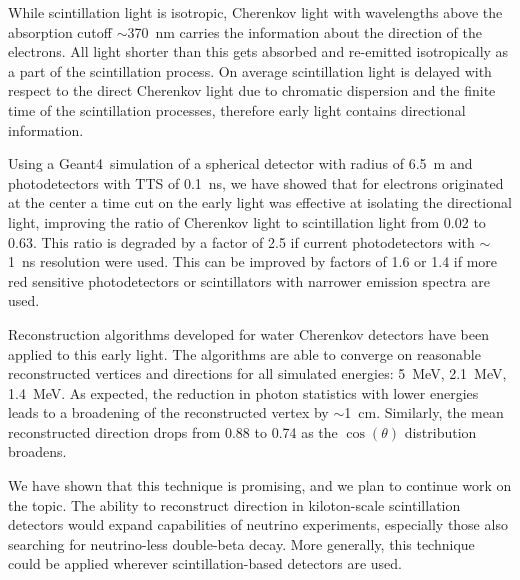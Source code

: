 \documentclass[cits]{JINST}
\begin{document}
While scintillation light is isotropic, Cherenkov light with wavelengths above the absorption cutoff $\sim$370~nm carries the information about the direction of the electrons. All light shorter than this gets absorbed and re-emitted isotropically as a part of the scintillation process. On average scintillation light is delayed with respect to the direct Cherenkov light due to chromatic dispersion and the finite time of the scintillation processes, therefore early light contains directional information.

Using a Geant4~simulation of a spherical detector with radius of 6.5~m and photodetectors with TTS of 0.1~ns, we have showed that for electrons originated at the center a time cut on the early light was effective at isolating the directional light, improving the ratio of Cherenkov light to scintillation light from 0.02 to 0.63. This ratio is degraded by a factor of 2.5 if current photodetectors with $\sim$1~ns resolution were used. This can be improved by factors of 1.6 or 1.4 if more red sensitive photodetectors or scintillators with narrower emission spectra are used.

Reconstruction algorithms developed for water Cherenkov detectors have been applied to this early light. The algorithms are able to converge on reasonable reconstructed vertices and directions for all simulated energies: 5~MeV, 2.1~MeV, 1.4~MeV. As expected, the reduction in photon statistics with lower energies leads to a broadening of the reconstructed vertex by $\sim$1~cm. Similarly, the mean reconstructed direction drops from 0.88 to 0.74 as the $\cos(\theta)$ distribution broadens.

We have shown that this technique is promising, and we plan to continue work on the topic. The ability to reconstruct direction in kiloton-scale scintillation detectors would expand capabilities of neutrino experiments, especially those also searching for neutrino-less double-beta decay. More generally, this technique could be applied wherever scintillation-based detectors are used.



\end{document}
